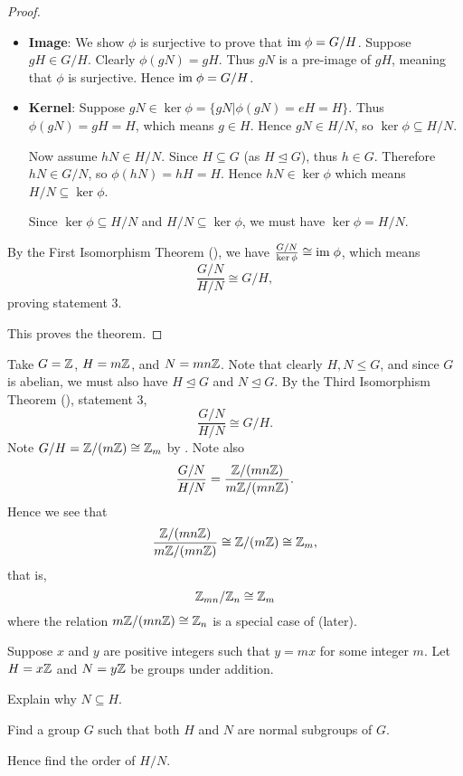 \begin{proof}
\begin{enumerate}
\begin{itemize}
            \item \textbf{Image}: We show $\phi$ is surjective to prove that $\mathrm{im}\;\phi = G/H$. Suppose $gH \in G/H$. Clearly $\phi(gN) = gH$. Thus $gN$ is a pre-image of $gH$, meaning that $\phi$ is surjective. Hence $\mathrm{im}\;\phi = G/H$.

            \item \textbf{Kernel}: Suppose $gN \in \ker\phi = \{gN \vert \phi(gN) = eH = H\}$. Thus $\phi(gN) = gH = H$, which means $g \in H$. Hence $gN \in H/N$, so $\ker\phi \subseteq H/N$.

            Now assume $hN \in H/N$. Since $H\subseteq G$ (as $H \unlhd G$), thus $h \in G$. Therefore $hN \in G/N$, so $\phi(hN) = hH = H$. Hence $hN \in \ker\phi$ which means $H/N \subseteq \ker\phi$.

            Since $\ker\phi \subseteq H/N$ and $H/N \subseteq \ker\phi$, we must have $\ker\phi = H/N$.
        \end{itemize}

        By the First Isomorphism Theorem (), we have $\frac{G/N}{\ker\phi} \cong \mathrm{im}\;\phi$, which means
        \[
            \frac{G/N}{H/N} \cong G/H,
        \]
        proving statement 3.
    \end{enumerate}
    This proves the theorem.
\end{proof}

\begin{example}
    Take $G = \mathbb{Z}$, $H = m\mathbb{Z}$, and $N = mn\mathbb{Z}$. Note that clearly $H, N \leq G$, and since $G$ is abelian, we must also have $H \unlhd G$ and $N \unlhd G$. By the Third Isomorphism Theorem (), statement 3,
    \[
        \frac{G/N}{H/N} \cong G/H.
    \]
    Note $G/H = \mathbb{Z}/(m\mathbb{Z}) \cong \mathbb{Z}_m$ by . Note also
    \[
        \frac{G/N}{H/N} = \frac{\mathbb{Z}/(mn\mathbb{Z})}{m\mathbb{Z}/(mn\mathbb{Z})}.
    \]
    Hence we see that
    \[
        \frac{\mathbb{Z}/(mn\mathbb{Z})}{m\mathbb{Z}/(mn\mathbb{Z})} \cong \mathbb{Z}/(m\mathbb{Z}) \cong \mathbb{Z}_m,
    \]
    that is,
    \[
        \mathbb{Z}_{mn}/\mathbb{Z}_n \cong \mathbb{Z}_m
    \]
    where the relation $m\mathbb{Z}/(mn\mathbb{Z}) \cong \mathbb{Z}_n$ is a special case of  (later).
\end{example}

\begin{exercise}
    Suppose $x$ and $y$ are positive integers such that $y = mx$ for some integer $m$. Let $H = x\mathbb{Z}$ and $N = y\mathbb{Z}$ be groups under addition.
    \begin{partquestions}{\roman*}
        \item Explain why $N \subseteq H$.
        \item Find a group $G$ such that both $H$ and $N$ are normal subgroups of $G$.
        \item Hence find the order of $H/N$.
    \end{partquestions}
\end{exercise}



